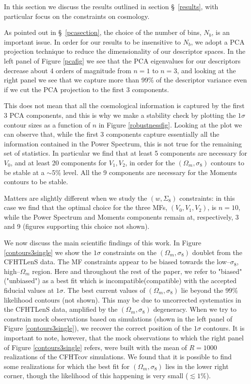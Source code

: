 \documentclass[reprint,aps,prd,superscriptaddress,showkeys,showpacs]{revtex4-1}
\begin{document}
In this section we discuss the results outlined in section \S~\ref{results}, with particular focus on the constraints on cosmology. 

As pointed out in \S~\ref{pcasection}, the choice of the number of bins, $N_b$, is an important issue. In order for our results to be insensitive to $N_b$, we adopt a PCA projection technique to reduce the dimensionality of our descriptor spaces. In the left panel of Figure \ref{pcafig} we see that the PCA eigenvalues for our descriptors decrease about 4 orders of magnitude from $n=1$ to $n=3$, and looking at the right panel we see that we capture more than 99\%  of the descriptor variance even if we cut the PCA projection to the first 3 components. 

This does not mean that all the cosmological information is captured by the first 3 PCA components, and this is why we make a stability check by plotting the $1\sigma$ contour sizes as a function of $n$ in Figure \ref{robustnessfig}. Looking at the plot we can observe that, while the first 3 components capture essentially all the information contained in the Power Spectrum, this is not true for the remaining set of statistics. In particular we find that at least 5 components are necessary for $V_0$, and at least 20 components for $V_1,V_2$, in order for the $(\Omega_m,\sigma_8)$ contours to be stable at a $\sim$5\% level. All the 9 components are necessary for the Moments contours to be stable. 

Matters are slightly different when we study the $(w,\Sigma_8)$ constraints: in this case we find that the optimal choice for the three MFs, $(V_0,V_1,V_2)$, is $n=10$, while the Power Spectrum and Moments components remain at, respectively, 3 and 9 (figures supporting this choice not shown).

We now discuss the main scientific findings of this work. In Figure \ref{contours3single} we show the $1\sigma$ constraints on the $(\Omega_m,\sigma_8)$ doublet from the CFHTLenS data. The MF constraints appear to be biased towards the low--$\sigma_8$, high--$\Omega_m$ region. Here and throughout the rest of the paper, we refer to "biased"("unbiased") as a best fit which is incompatible(compatible) with the accepted fiducial values at $1\sigma$. The best current values of $(\Omega_m,\sigma_8)$  \citep{PlanckXVI2013} lie beyond the 99\% likelihood contours (not shown). This may be due to uncorrected systematics in the CFHTLenS data, amplified by the $(\Omega_m,\sigma_8)$ degeneracy. When we try to constrain mock observations based on simulations (shown in the left panel of Figure \ref{contours3single}), we recover the correct position of the $1\sigma$ contours.  It is important to note, however, that the mock observations to which the right panel of Figure \ref{contours3single} refers, were built with the mean of $R=1000$ realizations of the CFHTcov simulations. We found that it is possible to find some realizations for which the best fit for $(\Omega_m,\sigma_8)$ lies in the lower right corner, though the likelihood of this happening is very small ($\lesssim1\%$). 
\end{document}
